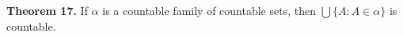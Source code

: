 \textbf{Theorem 17.} If $\alpha$ is a countable family of countable sets, then $\bigcup \{A : A \in \alpha\}$ is countable.
